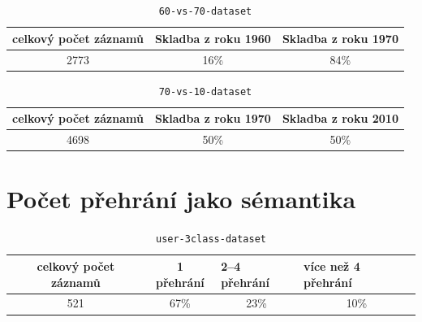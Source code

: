 \documentclass[thesis=M,czech]{FITthesis}[2012/06/26]
\begin{document}
\begin{table}[!htbp]
    \captionsetup{
      justification=raggedright,
      singlelinecheck=false
    }

    \caption{\texttt{60-vs-70-dataset}}
    \label{sec:60-vs-70-dataset}
    \begin{tabular}{|c|c|l|}
    \hline
    celkový počet záznamů      & Skladba z roku 1960                  & Skladba z roku 1970                   \\ \hline
    {\color[HTML]{000000} 2773} & {\color[HTML]{000000} 16\%} & \multicolumn{1}{c|}{84\%} \\ \hline
    \end{tabular}
\end{table}



\begin{table}[!htbp]
    \captionsetup{
      justification=raggedright,
      singlelinecheck=false
    }

    \caption{\texttt{70-vs-10-dataset}}
    \label{sec:70-vs-10-dataset}
    \begin{tabular}{|c|c|l|}
    \hline
    celkový počet záznamů      & Skladba z roku 1970                  & Skladba z roku 2010                   \\ \hline
    {\color[HTML]{000000} 4698} & {\color[HTML]{000000} 50\%} & \multicolumn{1}{c|}{50\%} \\ \hline
    \end{tabular}
\end{table}



\section{Počet přehrání jako sémantika}



\begin{table}[!htbp]
    \captionsetup{
      justification=raggedright,
      singlelinecheck=false
    }

    \caption{\texttt{user-3class-dataset}}
    \label{sec:user-3class-dataset}
    \begin{tabular}{|c|c|l|l|}
    \hline
    celkový počet záznamů      & 1 přehrání                  & 2--4 přehrání                   &  více než 4 přehrání                    \\ \hline
    {\color[HTML]{000000} 521} & {\color[HTML]{000000} 67\%} & \multicolumn{1}{c|}{23\%} & \multicolumn{1}{c|}{10\%} \\ \hline
    \end{tabular}
\end{table}
\end{document}
